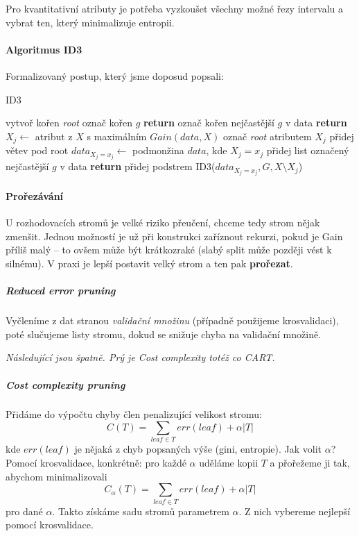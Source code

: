 \documentclass[11pt]{report} %
\numberwithin{equation}{section}
\begin{document}
Pro kvantitativní atributy je potřeba vyzkoušet všechny možné řezy intervalu a vybrat ten, který minimalizuje entropii.

\paragraph{Algoritmus ID3}
Formalizovaný postup, který jsme doposud popsali:
\bigskip
\begin{algorithm}[H]
	\caption{ID3}
	\begin{algorithmic}[1]
			\State vytvoř kořen \textit{root}
				\State označ kořen $g$
				\State \textbf{return}
			\EndIf
				\State označ kořen nejčastější $g$ v data
				\State \textbf{return}
			\EndIf
			\State $X_j \gets$ atribut z $X$ s maximálním $Gain(data,X)$
			\State označ \textit{root} atributem $X_j$
				\State přidej větev pod root
				\State $data_{X_j = x_j} \gets$ podmonžina $data$, kde $X_j = x_j$
					\State přidej list označený nejčastější $g$ v data
					\State \textbf{return}	
				\EndIf
				\State přidej podstrem ID3($data_{X_j=x_j}, G, X \setminus {X_j}$)
			\EndFor
		\EndFunction
	\end{algorithmic}
\end{algorithm}	

\paragraph{Prořezávání}
U rozhodovacích stromů je velké riziko přeučení, chceme tedy strom nějak zmenšit. Jednou možností je už při konstrukci zaříznout rekurzi, pokud je Gain příliš malý -- to ovšem může být krátkozraké (slabý split může později vést k silnému). V praxi je lepší postavit velký strom a ten pak \textbf{prořezat}.


\subparagraph{Reduced error pruning}
Vyčleníme z dat stranou \textit{validační množinu} (případně použijeme krosvalidaci), poté slučujeme listy stromu, dokud se snižuje chyba na validační množině.

\textit{Následující jsou špatně. Prý je Cost complexity totéž co CART.}

\subparagraph{Cost complexity pruning}
Přidáme do výpočtu chyby člen penalizující velikost stromu:
$$C(T) = \sum_{leaf \in T} err(leaf) + \alpha|T|$$ 
kde $err(leaf)$ je nějaká z chyb popsaných výše (gini, entropie). Jak volit $\alpha$? Pomocí krosvalidace, konkrétně: pro každé $\alpha$ uděláme kopii $T$ a přořežeme ji tak, abychom minimalizovali
$$C_\alpha(T) = \sum_{leaf \in T} err(leaf) + \alpha|T|$$ 
pro dané $\alpha$. Takto získáme sadu stromů  parametrem $\alpha$. Z nich vybereme nejlepší pomocí krosvalidace.
\end{document}
